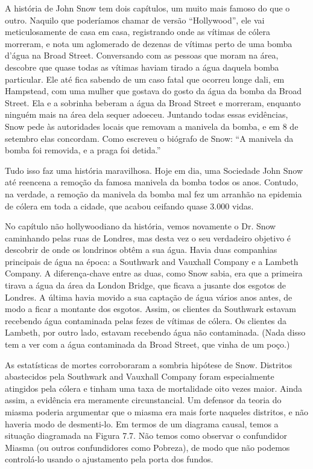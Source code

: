 \documentclass[11pt,a5paper,twoside]{book}
\begin{document}
A história de John Snow tem dois capítulos, um muito mais famoso do que o outro. Naquilo que poderíamos chamar de versão “Hollywood”, ele vai meticulosamente de casa em casa, registrando onde as vítimas de cólera morreram, e nota um aglomerado de dezenas de vítimas perto de uma bomba d’água na Broad Street. Conversando com as pessoas que moram na área, descobre que quase todas as vítimas haviam tirado a água daquela bomba particular. Ele até fica sabendo de um caso fatal que ocorreu longe dali, em Hampstead, com uma mulher que gostava do gosto da água da bomba da Broad Street. Ela e a sobrinha beberam a água da Broad Street e morreram, enquanto ninguém mais na área dela sequer adoeceu. Juntando todas essas evidências, Snow pede às autoridades locais que removam a manivela da bomba, e em 8 de setembro elas concordam. Como escreveu o biógrafo de Snow: “A manivela da bomba foi removida, e a praga foi detida.”

Tudo isso faz uma história maravilhosa. Hoje em dia, uma Sociedade John Snow até reencena a remoção da famosa manivela da bomba todos os anos. Contudo, na verdade, a remoção da manivela da bomba mal fez um arranhão na epidemia de cólera em toda a cidade, que acabou ceifando quase 3.000 vidas.

No capítulo não hollywoodiano da história, vemos novamente o Dr. Snow caminhando pelas ruas de Londres, mas desta vez o seu verdadeiro objetivo é descobrir de onde os londrinos obtêm a sua água. Havia duas companhias principais de água na época: a Southwark and Vauxhall Company e a Lambeth Company. A diferença-chave entre as duas, como Snow sabia, era que a primeira tirava a água da área da London Bridge, que ficava a jusante dos esgotos de Londres. A última havia movido a sua captação de água vários anos antes, de modo a ficar a montante dos esgotos. Assim, os clientes da Southwark estavam recebendo água contaminada pelas fezes de vítimas de cólera. Os clientes da Lambeth, por outro lado, estavam recebendo água não contaminada. (Nada disso tem a ver com a água contaminada da Broad Street, que vinha de um poço.)

As estatísticas de mortes corroboraram a sombria hipótese de Snow. Distritos abastecidos pela Southwark and Vauxhall Company foram especialmente atingidos pela cólera e tinham uma taxa de mortalidade oito vezes maior. Ainda assim, a evidência era meramente circunstancial. Um defensor da teoria do miasma poderia argumentar que o miasma era mais forte naqueles distritos, e não haveria modo de desmenti-lo. Em termos de um diagrama causal, temos a situação diagramada na Figura 7.7. Não temos como observar o confundidor Miasma (ou outros confundidores como Pobreza), de modo que não podemos controlá-lo usando o ajustamento pela porta dos fundos.
\end{document}
